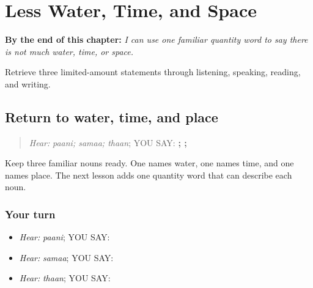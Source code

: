 
\chapter{Less Water, Time, and Space}
\label{ch:pa-a2-ghatt-quantity}

\begin{chapteropening}
\textbf{By the end of this chapter:} \emph{I can use one familiar quantity word to say there is not much water, time, or space.}

Retrieve three limited-amount statements through listening, speaking, reading, and writing.
\end{chapteropening}

\section[\texorpdfstring{\pa{ਪਾਣੀ} · \pa{ਸਮਾਂ} · \pa{ਥਾਂ} (paani; samaa; thaan)}{ਪਾਣੀ · ਸਮਾਂ · ਥਾਂ (paani; samaa; thaan)}]{Return to water, time, and place}

\label{lesson:PA-C191-amount-return}



\begin{quote}
\emph{Hear:} \emph{paani; samaa; thaan}; YOU SAY: \textbf{; ; }
\end{quote}

\begin{grammarlens}[title={Grammar Lens}]
Keep three familiar nouns ready. One names water, one names time, and one names place. The next lesson adds one quantity word that can describe each noun.
\end{grammarlens}

\subsection*{Your turn}
\begin{itemize}
\raggedright
  \item \emph{Hear:} \emph{paani}; YOU SAY: \textbf{}
  \item \emph{Hear:} \emph{samaa}; YOU SAY: \textbf{}
  \item \emph{Hear:} \emph{thaan}; YOU SAY: \textbf{}
\end{itemize}


